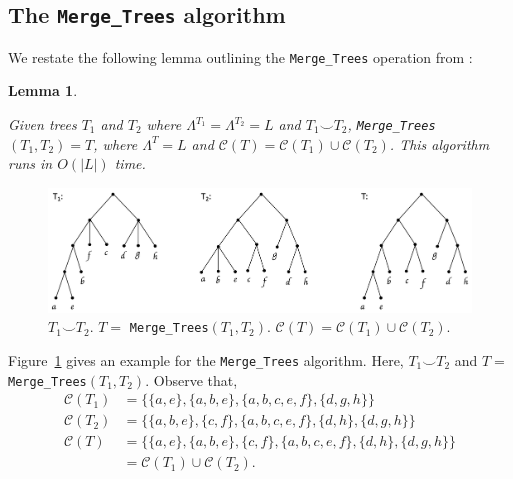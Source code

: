 \documentclass[12pt,a4paper]{article}
\newcommand{\compatible}{\smile}
\newcommand{\leafset}{\Lambda}
\newtheorem{mergetrees}[incompatibility]{Lemma}
\begin{document}
    \subsection{The \texttt{Merge\_Trees} algorithm}
    \label{subsec:mergetrees}

    We restate the following lemma outlining the \texttt{Merge\_Trees} operation from \cite{jansson2016improved}:
    \newline

    \begin{mergetrees}
        \label{lem:mergetrees}

        Given trees $T_1$ and $T_2$ where $\leafset^{T_1} = \leafset^{T_2} = L$ and $T_1 \compatible T_2$, \texttt{Merge\_Trees}$(T_1, T_2) = T$, where $\leafset^T = L$ and $\mathcal{C}(T) = \mathcal{C}(T_1) \cup \mathcal{C}(T_2)$. This algorithm runs in $O(|L|)$ time.
    \end{mergetrees}

    \begin{figure}[ht]
        \includegraphics[scale=0.5]{mergetrees}
        \centering
        \caption[The \texttt{Merge\_Trees} algorithm]{$T_1 \compatible T_2$. $T =$ \texttt{Merge\_Trees}$(T_1, T_2)$. $\mathcal{C}(T) = \mathcal{C}(T_1) \cup \mathcal{C}(T_2)$.}
        \label{fig:mergetrees}
    \end{figure}

    Figure~\ref{fig:mergetrees} gives an example for the \texttt{Merge\_Trees} algorithm. Here, $T_1 \compatible T_2$ and $T =$ \texttt{Merge\_Trees}$(T_1, T_2)$. Observe that,
    \begin{align*}
        \mathcal{C}(T_1) &= \{\{a, e\}, \{a, b, e\}, \{a, b, c, e, f\}, \{d, g, h\}\}\\
        \mathcal{C}(T_2) &= \{\{a, b, e\}, \{c, f\}, \{a, b, c, e, f\}, \{d, h\}, \{d, g, h\}\}\\
        \mathcal{C}(T) &= \{\{a, e\}, \{a, b, e\}, \{c, f\}, \{a, b, c, e, f\}, \{d, h\}, \{d, g, h\}\}\\
        &= \mathcal{C}(T_1) \cup \mathcal{C}(T_2).
    \end{align*}
\end{document}
